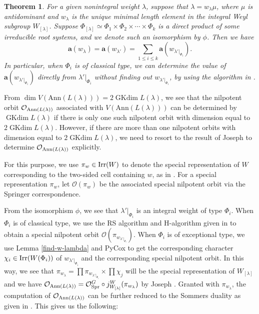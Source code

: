 \documentclass[reqno,12pt]{amsart}
\numberwithin{equation}{section}
\theoremstyle{plain}
\newtheorem{Thm}{Theorem}[section]
\theoremstyle{definition}
\newcommand{\lam}{\lambda}
\newcommand{\Ann}{\mathrm{Ann}}
\newcommand{\aff}{ \mathbf{a} }
\newcommand{\gkd}{\operatorname{GKdim}}
\newcommand{\lest}{\leqslant}
\begin{document}
\begin{Thm} \label{T:main1}
    For a given nonintegral weight $\lam$, suppose that $\lambda=w_{\lambda}\mu$, where $\mu$ is antidominant and $w_{\lambda}$ is the unique minimal length element in the integral Weyl subgroup $ W_{[\lam]}$.
Suppose  $\Phi_{[\lambda]}\simeq \Phi_1\times \Phi_2\times \cdots\times \Phi_k$  is a direct product of some irreducible root systems, and we denote such an isomorphism by $\phi$. Then we have  $$\aff(w_{\lambda})=\aff(w_{{\lam}'})=\sum_{1\lest i\lest k}\aff(w_{{\lam}'|_{\Phi_i}}).$$ 
In particular, when ${\Phi_i}$ is of classical type, we can determine the value of $\aff(w_{{\lam}'|_{\Phi_i}})$ directly from ${\lam}'|_{\Phi_i}$ without finding out ${w_{{\lam}'|_{\Phi_i}}}$, by using the algorithm in \cite{BXX}.
\end{Thm}




From $\dim V(\Ann(L(\lam)))=2\gkd L(\lam)$, we see that the nilpotent orbit $\mathcal{O}_{{\rm Ann}(L(\lambda))}$ associated with $V(\Ann(L(\lam)))$ can be determined by $\gkd L(\lam)$ if there is only one such nilpotent orbit with dimension equal to $2\gkd L(\lam)$. However, if there are more than one nilpotent orbits with dimension equal to $2\gkd L(\lam)$, we need to resort to the result of Joseph \cite{Jo85} to determine $\mathcal{O}_{{\rm Ann}(L(\lambda))}$ explicitly. 

For this purpose, we use $\pi_{w} \in {\rm Irr}(W)$ to denote the special representation of $W$ corresponding to the two-sided cell containing $w$, as in \cite{BMW}. For a special representation $\pi_{w}$, let $\mathcal{O}(\pi_{w})$ be the associated special nilpotent orbit via the Springer correspondence. 


From the isomorphism $\phi$, we see that $\lam'|_{{\Phi_i}}$ is an integral weight of type ${\Phi_i}$. When $\Phi_i$ is of classical type, we use the RS algorithm and H-algorithm given in \cite{BMW} to obtain a special  nilpotent orbit $\mathcal{O}(\pi_{w_{\lam'|_{{\Phi_i}}}})$. When $\Phi_i$ is of exceptional type, we  use  Lemma \ref{find-w-lambda} and PyCox to get  the corresponding character $\chi_i \in {\rm Irr}(W(\Phi_i))$ of $w_{\lam'|_{{\Phi_i}}}$ and the corresponding special  nilpotent orbit. In this way, we see that $\pi_{w_{\lam}}=\prod \pi_{w_{\lam'|_{{\Phi_i}}}} \times \prod \chi_j$ will be the special representation of $W_{[\lam]}$ and we have $\mathcal{O}_{{\rm Ann}(L(\lambda))} = \mathcal{O}_{\rm Spr}^G \circ j_{W_{[\lambda]}}^{W} (\pi_{w_\lambda})$ by Joseph \cite{Jo85}. Granted with $\pi_{w_\lambda}$, the computation of $\mathcal{O}_{{\rm Ann}(L(\lambda))}$ can be further reduced to the Sommers duality as given in \cite{Sommers}. This gives us the following:
\end{document}
